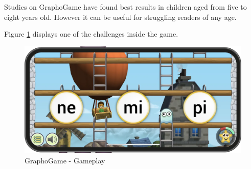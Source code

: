 Studies on GraphoGame have found best results in children aged from five to eight years old. However it can be useful for struggling readers of any age.

Figure \ref{fig:graphogame} displays one of the challenges inside the game.

\begin{figure}[H]
    \centering
    \includegraphics[width=0.8\linewidth]{Chapters/related_work_img/graphogamegameplay.png}
    \caption{GraphoGame - Gameplay}
    \label{fig:graphogame}
\end{figure}